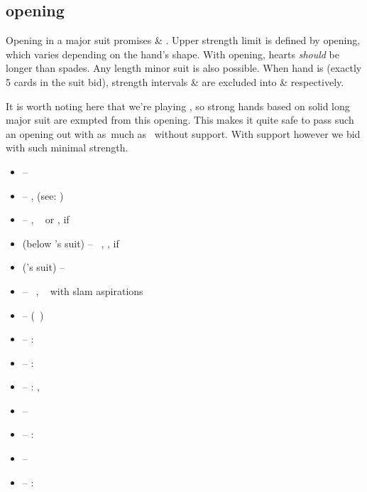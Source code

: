 \subsection{\ctr{1\protect\major} opening}
\label{subsec:1maj-op}

Opening in a major suit promises  \& . Upper strength limit is defined by \ctr{2\c} opening,
which varies depending on the hand's shape. With \ctr{1\h} opening, hearts \emph{should} be longer
than spades. Any length minor suit is also possible. When hand is \bal\/ (exactly 5 cards in the suit bid), strength
intervals  \&  are excluded into \ctr{1\nt} \& \ctr{2\nt} respectively.

It is worth noting here that  we're playing \hyperref[subsec:namyats]{}, so strong hands based on solid
long major suit are exmpted from this opening. This makes it quite safe to pass such an opening out with as~much
as~ without support. With support however we bid \hyperref[subsec:1nt-fc]{\ctr{1\nt} \force}\/ with such
minimal strength. \vspace{1em}

\begin{itemize}
   \newcommand{\strongws}{\hcp{16}{} if \ws{}}

  \item \ctr{1\s} --  
  \item \ctr{1\nt} -- \art, \force\/ (see: \hyperref[subsec:1nt-fc]{})
  \item \ctr{2\c} -- \semi\nat, \gf\ \bal\/ or , \strongws
  \item \ctr{2\d/\h} (below \opn's suit) -- \nat\ \gf, , \strongws
  \item \ctr{2\major} (\opn's suit) --  \ws{}
  \item \ctr{2\s} -- \nat\ \gf, \sol\  with slam aspirations
  \item \ctr{2\nt} -- \hyperref[subsec:jacoby]{} (\gf\ \ws{})
  \item \ctr{3\c} -- :  
  \item \ctr{3\d} -- :  
  \item {} -- :  , 
  \item {} -- \preempt\ 
  \item \ctr{3\s} -- : \gf\  \ws{} \shortness{\s}
  \item \ctr{3\nt} -- \so
  \item \ctr{4\minor} -- : \gf\  \ws{} \shortness{\minor}
\end{itemize}

